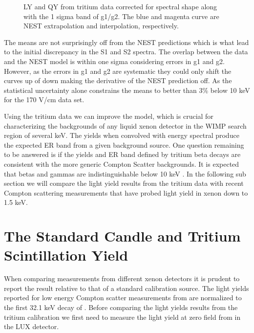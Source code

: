 \begin{figure}[p!]
\caption{LY and QY from tritium data corrected for spectral shape along with the 1 sigma band of g1/g2. The blue and magenta curve are NEST extrapolation and interpolation, respectively.}
\label{fig:LYQY_iter1}
\end{figure}
\renewcommand{\baselinestretch}{2}
\small\normalsize


The means are not surprisingly off from the NEST predictions which is what lead to the initial discrepancy in the S1 and S2 spectra. The overlap between the data and the NEST model is within one sigma considering errors in g1 and g2. However, as the errors in g1 and g2 are systematic they could only shift the curves up of down making the derivative of the NEST prediction off. As the statistical uncertainty alone constrains the means to better than 3\% below 10 keV for the 170 V/cm data set. 

Using the tritium data we can improve the model, which is crucial for characterizing the backgrounds of any liquid xenon detector in the WIMP search region of several keV. The yields when convolved with energy spectral produce the expected ER band from a given background source. One question remaining to be answered is if the yields and ER band defined by tritium beta decays are consistent with the more generic Compton Scatter backgrounds. It is expected that betas and gammas are indistinguishable below 10 keV \cite{NEST} \cite{NEST_2013}. In the following sub section we will compare the light yield results from the tritium data with recent Compton scattering measurements that have probed light yield in xenon down to 1.5 keV. 


\newpage

\section{The Standard Candle and Tritium Scintillation Yield}

When comparing measurements from different xenon detectors it is prudent to report the result relative to that of a standard calibration source. The light yields reported for low energy Compton scatter measurements from  \cite{Baudis} \cite{Aprile_LY} are normalized to the first 32.1 keV decay of \KrCal. Before comparing the light yields results from the tritium calibration we first need to measure the light yield at zero field from \KrCal  in the LUX detector.

